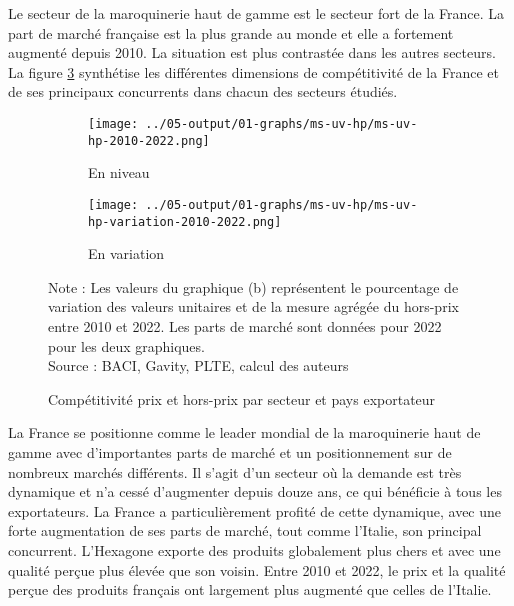 \documentclass[french,10pt,a4paper]{article}
\begin{document}
Le secteur de la maroquinerie haut de gamme est le secteur fort de la France. La part de marché française est la plus grande au monde et elle a fortement augmenté depuis 2010. La situation est plus contrastée dans les autres secteurs. La figure \ref{fig:graph-synthese} synthétise les différentes dimensions de compétitivité de la France et de ses principaux concurrents dans chacun des secteurs étudiés. 

\begin{figure}[!h]
  \centering
  \begin{subfigure}{\textwidth}
    \centering    \texttt{[image: ../05-output/01-graphs/ms-uv-hp/ms-uv-hp-2010-2022.png]}
    \caption{En niveau}
    \label{fig:ms-uv-hp}
  \end{subfigure}
  \vspace{0.5cm}
  \begin{subfigure}{\textwidth}
    \centering \texttt{[image: ../05-output/01-graphs/ms-uv-hp/ms-uv-hp-variation-2010-2022.png]}
 \caption{En variation}
 \label{fig:ms-uv-hp-variation}
  \end{subfigure}
  \captionsetup{justification=justified, singlelinecheck=false, font=small}
  \caption*{Note : Les valeurs du graphique (b) représentent le pourcentage de variation des valeurs unitaires et de la mesure agrégée du hors-prix entre 2010 et 2022. Les parts de marché sont données pour 2022 pour les deux graphiques.\\
  Source : BACI, Gavity, PLTE, calcul des auteurs}
  \captionsetup{justification=centering, singlelinecheck=true, font=normalsize}
  \caption{Compétitivité prix et hors-prix par secteur et pays exportateur}
  \label{fig:graph-synthese}
\end{figure}

\bigskip

La France se positionne comme le leader mondial de la maroquinerie haut de gamme avec d'importantes parts de marché et un positionnement sur de nombreux marchés différents. Il s'agit d'un secteur où la demande est très dynamique et n'a cessé d'augmenter depuis douze ans, ce qui bénéficie à tous les exportateurs. La France a particulièrement profité de cette dynamique, avec une forte augmentation de ses parts de marché, tout comme l'Italie, son principal concurrent. L'Hexagone exporte des produits globalement plus chers et avec une qualité perçue plus élevée que son voisin. Entre 2010 et 2022, le prix et la qualité perçue des produits français ont largement plus augmenté que celles de l'Italie.
\end{document}
